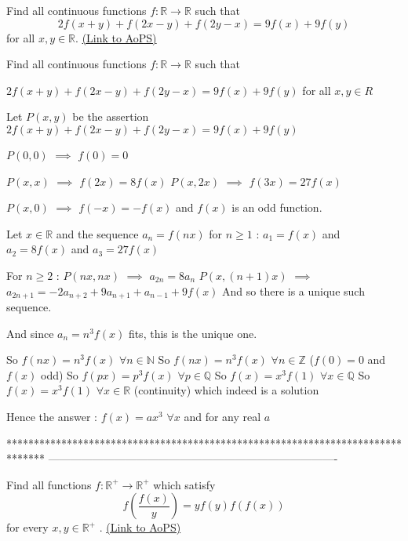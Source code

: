 \begin{problem}
	Find all continuous functions $f: \mathbb{R}\to\mathbb{R}$ such that \[2f(x+y)+f(2x-y)+f(2y-x)=9f(x)+9f(y)\] for all $x,y\in\mathbb{R}$.
	\flushright \href{https://artofproblemsolving.com/community/c6h446907}{(Link to AoPS)}
\end{problem}



\begin{solution}
	\begin{tcolorbox}Find all continuous functions $f: \mathbb{R}\to\mathbb{R}$ such that

$2f(x+y)+f(2x-y)+f(2y-x)=9f(x)+9f(y)$ for all $x,y\in{R}$\end{tcolorbox}
Let $P(x,y)$ be the assertion $2f(x+y)+f(2x-y)+f(2y-x)=9f(x)+9f(y)$

$P(0,0)$ $\implies$ $f(0)=0$

$P(x,x)$ $\implies$ $f(2x)=8f(x)$
$P(x,2x)$ $\implies$ $f(3x)=27f(x)$

$P(x,0)$ $\implies$ $f(-x)=-f(x)$ and $f(x)$ is an odd function.

Let $x\in\mathbb R$ and the sequence $a_n=f(nx)$ for $n\ge 1$ : $a_1=f(x)$ and $a_2=8f(x)$ and $a_3=27f(x)$

For $n\ge 2$ :
$P(nx,nx)$ $\implies$ $a_{2n}=8a_n$
$P(x,(n+1)x)$ $\implies$ $a_{2n+1}=-2a_{n+2}+9a_{n+1}+a_{n-1}+9f(x)$
And so there is a unique such sequence.

And since $a_n=n^3f(x)$ fits, this is the unique one.

So $f(nx)=n^3f(x)$ $\forall n\in\mathbb N$
So $f(nx)=n^3f(x)$ $\forall n\in\mathbb Z$ ($f(0)=0$ and $f(x)$ odd)
So $f(px)=p^3f(x)$ $\forall p\in\mathbb Q$ 
So $f(x)=x^3f(1)$ $\forall x\in\mathbb Q$
So $f(x)=x^3f(1)$ $\forall x\in\mathbb R$ (continuity) which indeed is a solution

Hence the answer : $\boxed{f(x)=ax^3}$ $\forall x$ and for any real $a$
\end{solution}
*******************************************************************************
-------------------------------------------------------------------------------

\begin{problem}
	Find all functions $ f : \mathbb{R}^+ \to \mathbb{R}^+ $ which satisfy
\[ f \left(\frac{f(x)}{y}\right)=yf(y)f(f(x)) \] for every $ x, y \in \mathbb{R}^+ $ .
	\flushright \href{https://artofproblemsolving.com/community/c6h446915}{(Link to AoPS)}
\end{problem}



